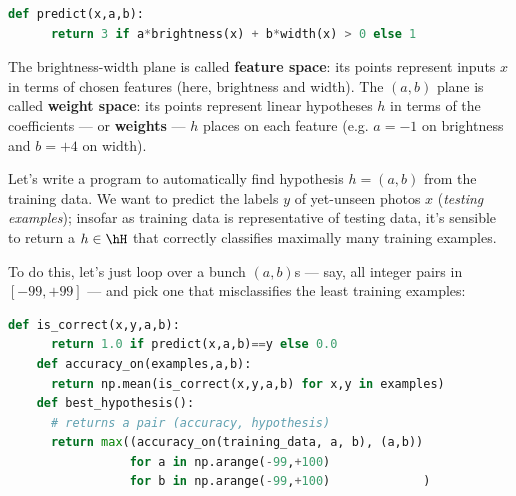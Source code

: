   \begin{lstlisting}[language=Python, basicstyle=\footnotesize\ttfamily]
    def predict(x,a,b):
      return 3 if a*brightness(x) + b*width(x) > 0 else 1
  \end{lstlisting}
  The brightness-width plane is called \textbf{feature space}: its points
  represent inputs $x$ in terms of chosen features (here, brightness and
  width).  The $(a,b)$ plane is called \textbf{weight space}: its points
  represent linear hypotheses $h$ in terms of the coefficients --- or \textbf{weights} ---
  $h$ places on each feature (e.g. $a=-1$ on brightness and $b=+4$ on width).




  Let's write a program to automatically find hypothesis $h=(a,b)$ from the
  training data.  We want to predict the labels $y$ of yet-unseen photos $x$
  (\emph{testing examples}); insofar as training data is representative of
  testing data, it's sensible to return a $h\in \hH$ that correctly classifies
  maximally many training examples.

  To do this, let's just loop over a bunch $(a,b)$s --- say, all integer
  pairs in $[-99,+99]$ --- and pick one that misclassifies the least
  training examples:
  \begin{lstlisting}[language=Python, basicstyle=\footnotesize\ttfamily]
    def is_correct(x,y,a,b):
      return 1.0 if predict(x,a,b)==y else 0.0
    def accuracy_on(examples,a,b):
      return np.mean(is_correct(x,y,a,b) for x,y in examples)
    def best_hypothesis():
      # returns a pair (accuracy, hypothesis)
      return max((accuracy_on(training_data, a, b), (a,b))
                 for a in np.arange(-99,+100)
                 for b in np.arange(-99,+100)             )
  \end{lstlisting}

